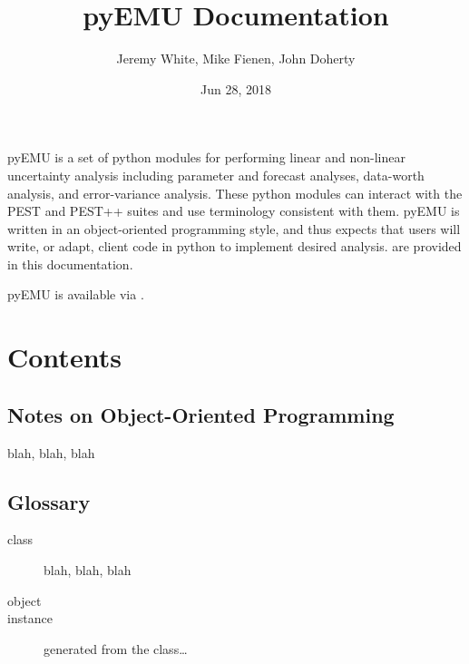 \documentclass[letterpaper,10pt,english]{sphinxmanual}
\title{pyEMU Documentation}
\date{Jun 28, 2018}
\author{Jeremy White, Mike Fienen, John Doherty}
\begin{document}
\maketitle
\sphinxtableofcontents
{}\label{\detokenize{index::doc}}


pyEMU \label{\detokenize{index:id1}}{\hyperref[\detokenize{index:wfd16}]{\sphinxcrossref{{[}WFD16{]}}}} is a set of python modules for performing linear and non-linear
uncertainty analysis including parameter and forecast analyses, data-worth
analysis, and error-variance analysis. These python modules can interact with
the PEST \label{\detokenize{index:id2}}{\hyperref[\detokenize{index:doh15}]{\sphinxcrossref{{[}DOH15{]}}}} and PEST++ \label{\detokenize{index:id3}}{\hyperref[\detokenize{index:wwhd15}]{\sphinxcrossref{{[}WWHD15{]}}}}  suites and use terminology consistent
with them.   pyEMU is written in an object-oriented programming style, and
thus expects that users will write, or adapt, client code in python to
implement desired analysis.  {\hyperref[\detokenize{source/oop::doc}]{}} are provided in this documentation.

pyEMU is available via  .


\chapter{Contents}
\label{\detokenize{index:contents}}\label{\detokenize{index:notes}}

\section{Notes on Object-Oriented Programming}
\label{\detokenize{source/oop:notes-on-object-oriented-programming}}\label{\detokenize{source/oop::doc}}
blah, blah, blah


\section{Glossary}
\label{\detokenize{source/glossary:glossary}}\label{\detokenize{source/glossary::doc}}\begin{description}
\item[{class\label{\detokenize{source/glossary:term-class}}}] \leavevmode
blah, blah, blah

\item[{object\label{\detokenize{source/glossary:term-object}}}] \leavevmode\item[{instance\label{\detokenize{source/glossary:term-instance}}}] \leavevmode
generated from the class…

\end{description}
\end{document}
